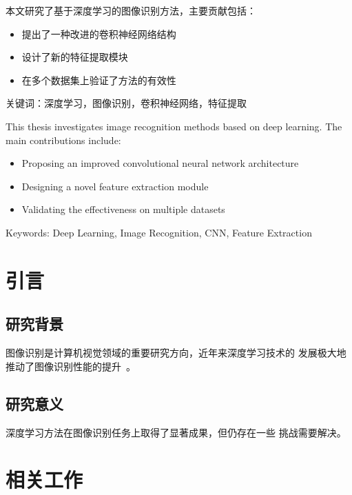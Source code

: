 \documentclass[degree=bachelor]{sduthesis}
\begin{document}
\MakeCover

\begin{cnabstract}
本文研究了基于深度学习的图像识别方法，主要贡献包括：
\begin{itemize}
  \item 提出了一种改进的卷积神经网络结构
  \item 设计了新的特征提取模块
  \item 在多个数据集上验证了方法的有效性
\end{itemize}
关键词：深度学习，图像识别，卷积神经网络，特征提取
\end{cnabstract}

\begin{enabstract}
This thesis investigates image recognition methods based on deep learning. The main contributions include:
\begin{itemize}
  \item Proposing an improved convolutional neural network architecture
  \item Designing a novel feature extraction module
  \item Validating the effectiveness on multiple datasets
\end{itemize}
Keywords: Deep Learning, Image Recognition, CNN, Feature Extraction
\end{enabstract}

\tableofcontents

\chapter{引言}
\label{chapter:intro}

\section{研究背景}
图像识别是计算机视觉领域的重要研究方向，近年来深度学习技术的
发展极大地推动了图像识别性能的提升~\cite{lecun2015deep}。

\section{研究意义}
深度学习方法在图像识别任务上取得了显著成果，但仍存在一些
挑战需要解决。

\chapter{相关工作}
\label{chapter:related}
\end{document}
